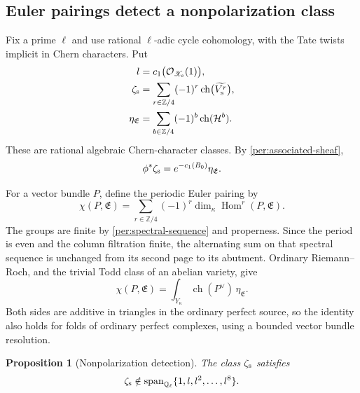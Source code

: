 \documentclass[11pt]{article}
\newtheorem{proposition}[theorem]{Proposition}
\theoremstyle{definition}
\theoremstyle{remark}
\newcommand{\Q}{\mathbb Q}
\newcommand{\Z}{\mathbb Z}
\DeclareMathOperator{\Hom}{Hom}
\DeclareMathOperator{\ch}{ch}
\newcommand{\cO}{\mathcal O}
\numberwithin{equation}{section}
\begin{document}
\subsection{Euler pairings detect a nonpolarization class}

Fix a prime $\ell$ and use rational $\ell$-adic cycle cohomology,
with the Tate twists implicit in Chern characters.  Put
\begin{equation}
 \begin{split}
 l&=c_1\bigl(\cO_{\mathscr X_{\rm s}}(1)\bigr),\\
 \zeta_{\rm s}
   &=\sum_{r\in\Z/4}(-1)^r
                  \ch\bigl(\widetilde{V_{\rm s}^r}\bigr),\\
 \eta_{\mathfrak E}
   &=\sum_{b\in\Z/4}(-1)^b\ch(\mathcal H^b).
 \end{split}
 \label{per:characters}
\end{equation}
These are rational algebraic Chern-character classes.  By
\eqref{per:associated-sheaf},
\begin{equation}
 \phi^*\zeta_{\rm s}
       =e^{-c_1(B_0)}\eta_{\mathfrak E}.
 \label{per:character-comparison}
\end{equation}

For a vector bundle $P$, define the periodic Euler pairing by
\[
 \chi(P,\mathfrak E)
    =\sum_{r\in\Z/4}(-1)^r
                       \dim_\kappa\Hom^r(P,\mathfrak E).
\]
The groups are finite by \eqref{per:spectral-sequence} and properness.
Since the period is even and the column filtration finite, the
alternating sum on that spectral sequence is unchanged from its
second page to its abutment.  Ordinary Riemann--Roch, and the trivial
Todd class of an abelian variety, give
\begin{equation}
 \chi(P,\mathfrak E)
    =\int_{Y_\kappa}\ch(P^\vee)\,\eta_{\mathfrak E}.
 \label{per:rr}
\end{equation}
Both sides are additive in triangles in the ordinary perfect source,
so the identity also holds for folds of ordinary perfect complexes,
using a bounded vector bundle resolution.

\begin{proposition}[Nonpolarization detection]
\label{per:nonpolarization}
The class $\zeta_{\rm s}$ satisfies
\begin{equation}
 \zeta_{\rm s}\notin
       \operatorname{span}_{\Q_\ell}\{1,l,l^2,\ldots,l^8\}.
 \label{per:nonpolarization-equation}
\end{equation}
\end{proposition}
\end{document}

